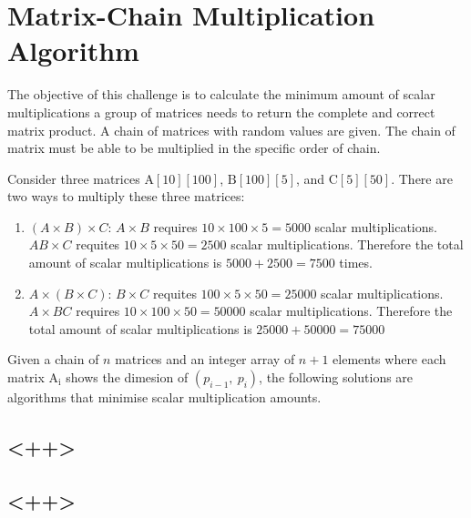 \chapter{Matrix-Chain Multiplication Algorithm}
The objective of this challenge is to calculate the minimum amount of scalar
multiplications a group of matrices needs to return the complete and correct
matrix product. A chain of matrices with random values are given. The chain of
matrix must be able to be multiplied in the specific order of chain.

Consider three matrices $\mathrm{A}[10][100]$, $\mathrm{B}[100][5]$, and
$\mathrm{C}[5][50]$. There are two ways to multiply these three matrices:
\begin{enumerate}
\item $(A\times B)\times C$: $A\times B$ requires $10\times100\times5=5000$
    scalar multiplications. $AB\times C$ requites $10\times5\times50=2500$
    scalar multiplications. Therefore the total amount of scalar multiplications
    is $5000+2500=7500$ times.
\item $A\times(B\times C)$: $B\times C$ requites $100\times5\times50=25000$
    scalar multiplications. $A\times BC$ requires $10\times100\times50=50000$
    scalar multiplications. Therefore the total amount of scalar multiplications
    is $25000+50000=75000$
\end{enumerate}

Given a chain of $n$ matrices and an integer array of $n+1$ elements where each
matrix $\mathrm{A_i}$ shows the dimesion of $\left(p_{i-1},~p_i\right)$, the
following solutions are algorithms that minimise scalar multiplication amounts.

\section{<++>}


\section{<++>}
